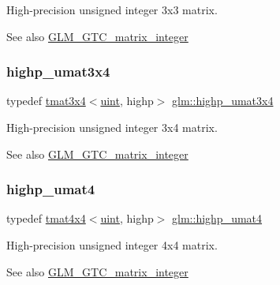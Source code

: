 High-\/precision unsigned integer 3x3 matrix. \begin{DoxySeeAlso}{See also}
\hyperlink{group__gtc__matrix__integer}{G\+L\+M\+\_\+\+G\+T\+C\+\_\+matrix\+\_\+integer} 
\end{DoxySeeAlso}
\mbox{\label{group__gtc__matrix__integer_gaa2fb29026c9c80c7d17b5389e36d6aa7}} 
\subsubsection{\texorpdfstring{highp\+\_\+umat3x4}{highp\_umat3x4}}
{\footnotesize\ttfamily typedef \hyperlink{structglm_1_1tmat3x4}{tmat3x4}$<$\hyperlink{group__core__precision_ga4fd29415871152bfb5abd588334147c8}{uint}, highp$>$ \hyperlink{group__gtc__matrix__integer_gaa2fb29026c9c80c7d17b5389e36d6aa7}{glm\+::highp\+\_\+umat3x4}}

High-\/precision unsigned integer 3x4 matrix. \begin{DoxySeeAlso}{See also}
\hyperlink{group__gtc__matrix__integer}{G\+L\+M\+\_\+\+G\+T\+C\+\_\+matrix\+\_\+integer} 
\end{DoxySeeAlso}
\mbox{\label{group__gtc__matrix__integer_ga7b0e78c54432c7236d8b96473b7423ec}} 
\subsubsection{\texorpdfstring{highp\+\_\+umat4}{highp\_umat4}}
{\footnotesize\ttfamily typedef \hyperlink{structglm_1_1tmat4x4}{tmat4x4}$<$\hyperlink{group__core__precision_ga4fd29415871152bfb5abd588334147c8}{uint}, highp$>$ \hyperlink{group__gtc__matrix__integer_ga7b0e78c54432c7236d8b96473b7423ec}{glm\+::highp\+\_\+umat4}}

High-\/precision unsigned integer 4x4 matrix. \begin{DoxySeeAlso}{See also}
\hyperlink{group__gtc__matrix__integer}{G\+L\+M\+\_\+\+G\+T\+C\+\_\+matrix\+\_\+integer} 
\end{DoxySeeAlso}
\mbox{\label{group__gtc__matrix__integer_ga4015bf99a981bf271fd516f9b2cb6724}} 
